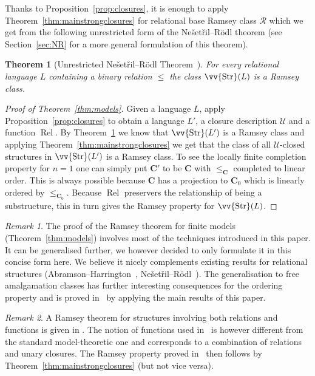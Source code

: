 \documentclass{elsarticle}
\def\Rel{\mathop{\mathrm{Rel}}\nolimits}
\def\Str{\mathop{\mathrm{Str}}\nolimits}
\def\ordclass#1{\vv{#1}}
\def\str#1{\mathbf {#1}}
\theoremstyle{plain}
\newtheorem{theorem}{Theorem}[section]
\theoremstyle{definition}
\theoremstyle{remark}
\newtheorem*{remark}{Remark}
\begin{document}
Thanks to Proposition~\ref{prop:closures}, it is enough to apply Theorem~\ref{thm:mainstrongclosures}
for relational base Ramsey class $\mathcal R$ which we get from the following unrestricted form of the
Ne\v set\v ril--R\"odl theorem (see Section~\ref{sec:NR} for a more general formulation of this theorem).
\begin{theorem}[Unrestricted Ne\v set\v ril--R\"odl Theorem~\cite{Nevsetvril1977,Abramson1978}]
\label{thm:NRsimple}
For every relational language $L$ containing a binary relation $\leq$ the class $\ordclass{\Str}(L)$ is a Ramsey class.
\end{theorem}
\begin{proof}[Proof of Theorem~\ref{thm:models}]
Given a language $L$, apply Proposition~\ref{prop:closures} to obtain a language $L'$, a closure description $\mathcal U$ and a function $\Rel$.
By Theorem~\ref{thm:NRsimple} we know that $\ordclass{\Str}(L')$ is a Ramsey class and applying
Theorem~\ref{thm:mainstrongclosures} we get that the class of all $\mathcal U$-closed structures
in $\ordclass{\Str}(L')$ is a Ramsey class. To see the locally finite completion property for $n=1$ one can simply put $\str{C'}$ to be $\str{C}$ with $\leq_\str{C}$ completed to linear order. This is always possible because $\str{C}$ has a projection to $\str{C}_0$ which is linearly ordered by $\leq_{\str{C}_0}$.
Because $\Rel$ preservers the relationship of being a substructure, this in turn gives the Ramsey property for $\ordclass{\Str}(L)$.
\end{proof}
\begin{remark}
The proof of the Ramsey theorem for finite models (Theorem~\ref{thm:models}) involves most of the techniques introduced in this paper. It can be generalised further, we however decided to only formulate it in this concise form here. We believe it nicely complements existing results for relational structures (Abramson--Harrington~\cite{Abramson1978}, Ne\v set\v ril--R\"odl~\cite{Nevsetvril1977}). The generalisation to free amalgamation classes has further interesting consequences for the ordering property and is proved in~\cite{Evans3} by applying the main results of this paper.
\end{remark}

\begin{remark}
A Ramsey theorem for structures involving both relations and functions
is given in \cite{Solecki2012}. The notion of functions used
in~\cite{Solecki2012} is however different from the standard model-theoretic one
and corresponds to a combination of relations and unary closures.
The Ramsey property proved in~\cite{Solecki2012} then follows by Theorem~\ref{thm:mainstrongclosures} (but not vice versa).
\end{remark}
\end{document}
